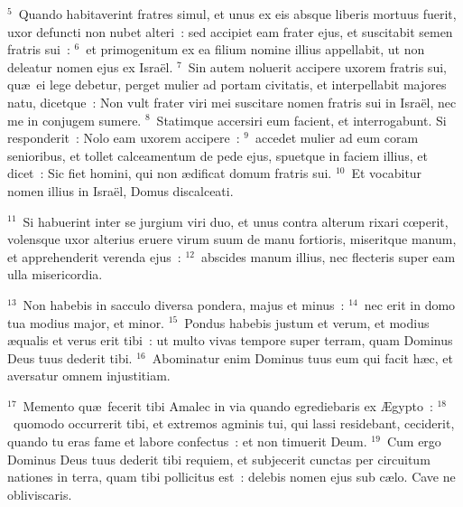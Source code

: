 ${}^{5}$~Quando habitaverint fratres simul, et unus ex eis absque liberis mortuus fuerit, uxor defuncti non nubet alteri~: sed accipiet eam frater ejus, et suscitabit semen fratris sui~:
${}^{6}$~et primogenitum ex ea filium nomine illius appellabit, ut non deleatur nomen ejus ex Isra\"el.
${}^{7}$~Sin autem noluerit accipere uxorem fratris sui, qu\ae\ ei lege debetur, perget mulier ad portam civitatis, et interpellabit majores natu, dicetque~: Non vult frater viri mei suscitare nomen fratris sui in Isra\"el, nec me in conjugem sumere.
${}^{8}$~Statimque accersiri eum facient, et interrogabunt. Si responderit~: Nolo eam uxorem accipere~:
${}^{9}$~accedet mulier ad eum coram senioribus, et tollet calceamentum de pede ejus, spuetque in faciem illius, et dicet~: Sic fiet homini, qui non \ae dificat domum fratris sui.
${}^{10}$~Et vocabitur nomen illius in Isra\"el, Domus discalceati.


${}^{11}$~Si habuerint inter se jurgium viri duo, et unus contra alterum rixari cœperit, volensque uxor alterius eruere virum suum de manu fortioris, miseritque manum, et apprehenderit verenda ejus~:
${}^{12}$~abscides manum illius, nec flecteris super eam ulla misericordia.


${}^{13}$~Non habebis in sacculo diversa pondera, majus et minus~:
${}^{14}$~nec erit in domo tua modius major, et minor.
${}^{15}$~Pondus habebis justum et verum, et modius \ae qualis et verus erit tibi~: ut multo vivas tempore super terram, quam Dominus Deus tuus dederit tibi.
${}^{16}$~Abominatur enim Dominus tuus eum qui facit h\ae c, et aversatur omnem injustitiam.


${}^{17}$~Memento qu\ae\ fecerit tibi Amalec in via quando egrediebaris ex \AE gypto~:
${}^{18}$~quomodo occurrerit tibi, et extremos agminis tui, qui lassi residebant, ceciderit, quando tu eras fame et labore confectus~: et non timuerit Deum.
${}^{19}$~Cum ergo Dominus Deus tuus dederit tibi requiem, et subjecerit cunctas per circuitum nationes in terra, quam tibi pollicitus est~: delebis nomen ejus sub c\ae lo. Cave ne obliviscaris.

